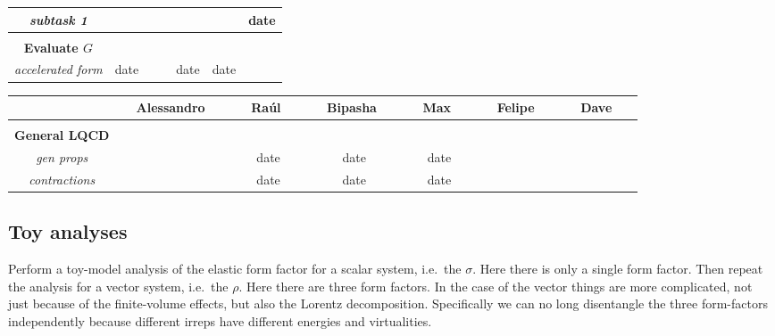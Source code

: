 \begin{center}
\begin{tabular}{ c | c | c | c | c | c | c  }
{\em subtask 1}  &                            &                      &                        &                   &                     & date               \\ \hline \\[-10pt] \hline
%
{\bf Evaluate $G$}  &                        &                      &                        &                   &                     &                      \\ \hline
{\em accelerated form} & date          &                      &                        & date           & date            &                      \\ \hline  
%
\end{tabular}
\end{center}


\begin{center}
  \begin{tabular}{ c | c | c | c | c | c | c  }
    \hline
                           & \ \ Alessandro \ \  & \ \  Ra\'ul \ \  & \ \ Bipasha \ \  & \ \  Max \ \  & \ \  Felipe \ \  & \ \  Dave \ \   \\ \hline \\[-10pt] \hline
%
 {\bf General LQCD} &                      &                      &                        &                   &                     &                      \\ \hline
 {\em gen props} &                            & date              & date                & date           &                     &                      \\ \hline
 {\em contractions} &                         & date             & date                & date            &                     &                      \\ \hline  
%
\end{tabular}
\end{center}


\subsection{Toy analyses}

Perform a toy-model analysis of  the elastic form factor for a scalar system, i.e.~the $\sigma$. Here there is only a single form factor. Then repeat the analysis for a vector system, i.e.~the $\rho$. Here there are three form factors. In the case of the vector things are more complicated, not just because of the finite-volume effects, but also the Lorentz decomposition. Specifically we can no long disentangle the three form-factors independently because different irreps have different energies and virtualities.

